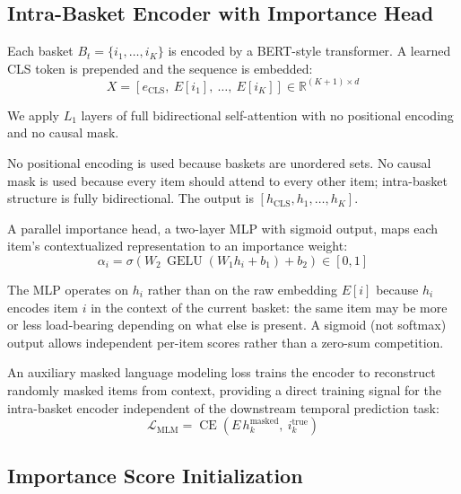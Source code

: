 \documentclass[conference]{IEEEtran}
\begin{document}
\subsection{Intra-Basket Encoder with Importance Head}

Each basket $B_t = \{i_1, \ldots, i_K\}$ is encoded by a BERT-style
transformer. A learned CLS token is prepended and the sequence is
embedded:
\begin{equation}
X = [e_{\text{CLS}},\ E[i_1],\ \ldots,\ E[i_K]] \in \mathbb{R}^{(K+1) \times d}
\end{equation}

We apply $L_1$ layers of full bidirectional self-attention with no
positional encoding and no causal mask.

No positional encoding is used because baskets are unordered sets.
No causal mask is used because every item should attend to every other
item; intra-basket structure is fully bidirectional. The output is
$[h_{\text{CLS}}, h_1, \ldots, h_K]$.

A parallel importance head, a two-layer MLP with sigmoid output,
maps each item's contextualized representation to an importance weight:
\begin{equation}
\alpha_i = \sigma\!\left(W_2\, \operatorname{GELU}(W_1 h_i + b_1) + b_2\right) \in [0,1]
\end{equation}

The MLP operates on $h_i$ rather than on the raw embedding $E[i]$
because $h_i$ encodes item $i$ in the context of the current basket:
the same item may be more or less load-bearing depending on what else
is present. A sigmoid (not softmax) output allows independent per-item
scores rather than a zero-sum competition.

An auxiliary masked language modeling loss trains the encoder to
reconstruct randomly masked items from context, providing a direct
training signal for the intra-basket encoder independent of the
downstream temporal prediction task:
\begin{equation}
\mathcal{L}_{\text{MLM}} = \operatorname{CE}\!\left(E\, h_k^{\text{masked}},\ i_k^{\text{true}}\right)
\end{equation}

\subsection{Importance Score Initialization}
\end{document}

